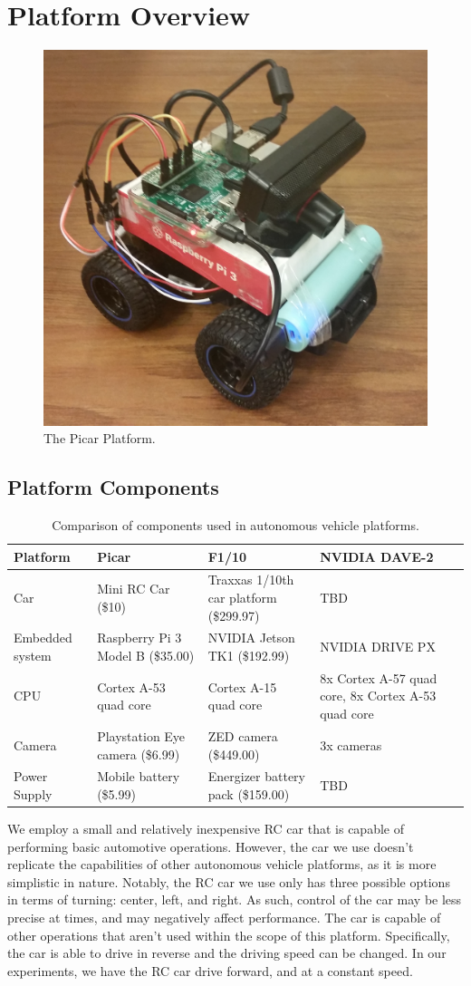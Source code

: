 \section{Platform Overview}

\begin{figure}[h]
  \centering
  \includegraphics[width=.4\textwidth]{Picar_Picture}
  \caption{ The Picar Platform. }
\end{figure}

\subsection{Platform Components}

\begin{table}[h]
  \centering
  \begin{tabular} {| l | l | l | l | l |}
    \hline
    \textbf{Platform} & \textbf{Picar} & \textbf{F1/10} & \textbf{NVIDIA DAVE-2}\\ \hline 
    Car & Mini RC Car (\$10) & Traxxas 1/10th car platform (\$299.97) & TBD\\ \hline
    Embedded system & Raspberry Pi 3 Model B (\$35.00) & NVIDIA Jetson TK1 (\$192.99) & NVIDIA DRIVE PX \\ \hline
    CPU & Cortex A-53 quad core & Cortex A-15 quad core & 8x Cortex A-57 quad core, 8x Cortex A-53 quad core \\ \hline
    Camera & Playstation Eye camera (\$6.99) & ZED camera (\$449.00) & 3x cameras\\ \hline
    Power Supply & Mobile battery (\$5.99) & Energizer battery pack (\$159.00) & TBD\\
    \hline
  \end{tabular}
  \caption{Comparison of components used in autonomous vehicle platforms.}
\end{table}

We employ a small and relatively inexpensive RC car that is capable of performing basic automotive 
operations. However, the car we use doesn't replicate the capabilities of other autonomous vehicle 
platforms, as it is more simplistic in nature. Notably, the RC car we use only has three possible 
options in terms of turning: center, left, and right. As such, control of the car may be less precise at 
times, and may negatively affect performance. The car is capable of other operations that aren't used 
within the scope of this platform. Specifically, the car is able to drive in reverse and the driving 
speed can be changed. In our experiments, we have the RC car drive forward, and at a constant speed.


